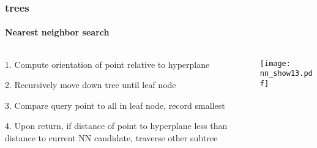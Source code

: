 \begin{frame}[noframenumbering]
  \frametitle{\kd trees}
  \framesubtitle{Nearest neighbor search}
  \begin{columns}[T]
    \begin{column}{.5\textwidth}
      \begin{block}{}%
        {\color{white} 1.\hspace{1mm} Compute orientation of point relative to hyperplane
          \\\vspace{0.4cm}
        
        2.\hspace{1mm} Recursively move down tree until leaf node\\\vspace{0.4cm}

        {\color{graph-red}
        3.\hspace{1mm} Compare query point to all in leaf node, record smallest}\\\vspace{0.4cm}
    
        4.\hspace{1mm} Upon return, if distance of point to hyperplane less than distance to current
          NN candidate, traverse other subtree}
      \end{block}
    \end{column}
    \begin{column}{.5\textwidth}
      \begin{block}{}
        \texttt{[image: nn\_show13.pdf]}
      \end{block}
    \end{column}
  \end{columns}
\end{frame}
